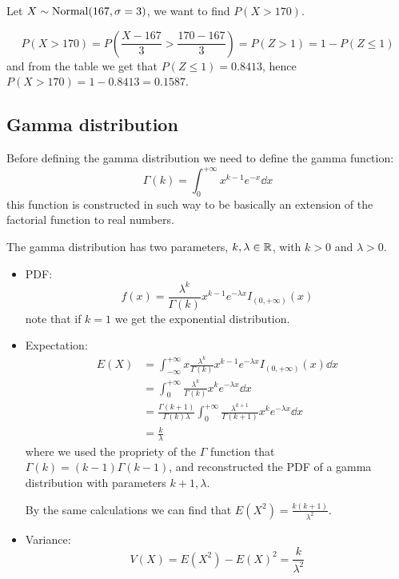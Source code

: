 \documentclass[12pt]{extarticle}
\begin{document}
\begin{example}
    Let $X \sim \operatorfont{Normal}(167, \sigma = 3)$, we want to find $P(X > 170)$.

    \begin{equation}
        P(X>170) = P(\frac{X - 167}{3} > \frac{170 - 167}{3}) = P(Z > 1) = 1 - P(Z \leq 1)
    \end{equation}
    and from the table we get that $P(Z \leq 1) = 0.8413$, hence $P(X > 170) = 1 - 0.8413 = 0.1587$.
\end{example}

\subsection{Gamma distribution}

Before defining the gamma distribution we need to define the gamma function:
\begin{equation}
    \Gamma(k) = \int_0^{+\infty}x^{k-1}e^{-x} \dd{x}
\end{equation}
this function is constructed in such way to be basically an extension of the factorial function to real numbers.

The gamma distribution has two parameters, $k, \lambda \in \mathbb{R}$, with $k > 0$ and $\lambda > 0$.

\begin{itemize}
    \item PDF:
          \begin{equation}
              f(x) = \frac{\lambda^k}{\Gamma(k)} x^{k-1} e^{-\lambda x} I_{(0, +\infty)}(x)
          \end{equation}
          note that if $k = 1$ we get the exponential distribution.
    \item Expectation:
          \begin{align}
              E(X) & = \int_{-\infty}^{+\infty} x \frac{\lambda^k}{\Gamma(k)} x^{k-1} e^{-\lambda x} I_{(0, +\infty)}(x) \dd{x}               \\
                   & = \int_{0}^{+\infty} \frac{\lambda^k}{\Gamma(k)} x^{k} e^{-\lambda x} \dd{x}                                             \\
                   & = \frac{\Gamma(k+1)}{\Gamma(k) \lambda} \int_{0}^{+\infty} \frac{\lambda^{k+1}}{\Gamma(k+1)} x^{k} e^{-\lambda x} \dd{x} \\
                   & = \frac{k}{\lambda}
          \end{align}
          where we used the propriety of the $\Gamma$ function that $\Gamma(k) = (k-1) \Gamma(k-1)$, and reconstructed the PDF of a gamma distribution with parameters $k+1, \lambda$.

          By the same calculations we can find that $E(X^2) = \frac{k(k+1)}{\lambda^2}$.

    \item Variance:
          \begin{equation}
              V(X) = E(X^2) - E(X)^2 = \frac{k}{\lambda^2}
          \end{equation}
\end{itemize}
\end{document}
